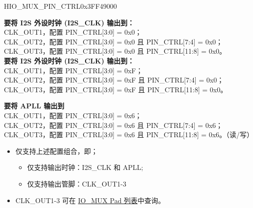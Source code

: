 \begin{register}{H}{IO\_MUX\_PIN\_CTRL}{0x3FF49000}\label{regdesc:IOMUXPINCTRL}
%
%
%
%
\regnewline%
\begin{regdesc}
{\bfseries 要将 I2S 外设时钟 (I2S\_CLK) 输出到：}\\
CLK\_OUT1，配置 PIN\_CTRL[3:0] = 0x0；\\
CLK\_OUT2，配置 PIN\_CTRL[3:0] = 0x0 且 PIN\_CTRL[7:4] = 0x0；\\
CLK\_OUT3，配置 PIN\_CTRL[3:0] = 0x0 且 PIN\_CTRL[11:8] = 0x0。\\
{\bfseries 要将 I2S 外设时钟 (I2S\_CLK) 输出到：}\\
CLK\_OUT1，配置 PIN\_CTRL[3:0] = 0xF；\\
CLK\_OUT2，配置 PIN\_CTRL[3:0] = 0xF 且 PIN\_CTRL[7:4] = 0x0；\\
CLK\_OUT3，配置 PIN\_CTRL[3:0] = 0xF 且 PIN\_CTRL[11:8] = 0x0。

{\bfseries 要将 APLL 输出到}\\
CLK\_OUT1，配置 PIN\_CTRL[3:0] = 0x6；\\
CLK\_OUT2，配置 PIN\_CTRL[3:0] = 0x6 且 PIN\_CTRL[7:4] = 0x6；\\
CLK\_OUT3，配置 PIN\_CTRL[3:0] = 0x6 且 PIN\_CTRL[11:8] = 0x6。（读/写）
\end{regdesc}
\end{register}

\vspace{-2em}
\begin{tiplisting}
\vspace{-2em}
\begin{itemize}
\item 仅支持上述配置组合，即；
\begin{itemize}
    \item 仅支持输出时钟：I2S\_CLK 和 APLL;
    \item 仅支持输出管脚：CLK\_OUT1-3
\end{itemize}

\item CLK\_OUT1-3 可在 \hyperref[table:iomux_pads]{IO\_MUX Pad 列表}中查询。
\end{itemize}
\end{tiplisting}


